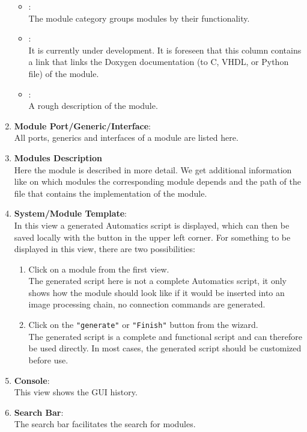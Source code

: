 \begin{enumerate}
\begin{itemize}
		\item {}:\\
			The module category groups modules by their functionality.
		\item {}:\\It is currently under development. It is foreseen that this column contains a link that links the Doxygen documentation (to C, VHDL, or Python file) of the module.
		\item {}:\\ A rough description of the module.
		\end{itemize}
		\item \textbf{Module Port/Generic/Interface}:\\
			All ports, generics and interfaces of a module are listed here.
		\item \textbf{Modules Description }\\
		Here the module is described in more detail. We get additional information like on which modules the corresponding module depends and the path of the file that contains the implementation of the module.
		\item \textbf{System/Module Template}:\\
		In this view a generated Automatics script is displayed, which can then be saved locally with the button in the upper left corner.
		For something to be displayed in this view, there are two possibilities:
		\begin{enumerate}
			\item Click on a module from the first view.\\
			The generated script here is not a complete Automatics script, it only shows how the module should look like if it would be inserted into an image processing chain, no connection commands are generated.
			\item Click on the \texttt{"generate"} or \texttt{"Finish"} button from the wizard.\\
			The generated script is a complete and functional \automatics script and can therefore be used directly. In most cases, the generated script should be customized before use. 
		\end{enumerate}
		\item \textbf{\asterics Console}:\\
		This view shows the GUI history.
		\item \textbf{Search Bar}:\\
		The search bar facilitates the search for modules.  

\end{enumerate}
